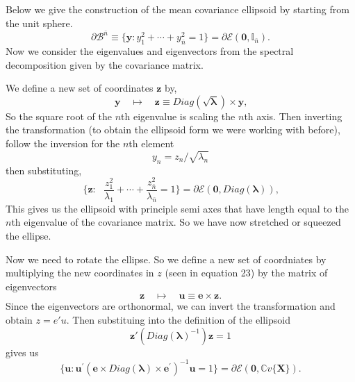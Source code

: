 \documentclass{article}
\theoremstyle{definition}
\theoremstyle{remark}
\begin{document}
\par Below we give the construction of the mean covariance ellipsoid
by starting from the unit sphere. 
\begin{equation}
    \partial\mathcal{B}^{\bar{n}}\equiv\{\boldsymbol{y}:y_{1}^{2}+\cdots +y_{\bar{n}}^{2}=1\}=\partial\mathcal{E}(\boldsymbol{0},\mathbb{I}_{\bar{n}})\text{.}
    \end{equation}
Now we consider the eigenvalues and eigenvectors from the spectral decomposition
given by the covariance matrix. 
\par We define a new set of coordinates $\mathbf{z}$ by,
\begin{equation}
    \boldsymbol{y}\quad\mapsto\quad\boldsymbol{z}\equiv\mathit{Diag}(\sqrt{\boldsymbol{\lambda}})\times\boldsymbol{y}\text{,}
    \end{equation}
So the square root of the $n$th eigenvalue
is scaling the $n$th axis. Then inverting the transformation (to obtain 
the ellipsoid form we were working with before), follow the inversion for the $n$th element 
\[
y_n = z_n / \sqrt{\lambda_n}
\]
then substituting, 
\begin{equation}
    \{\boldsymbol{z}:\text{\ }\frac{z_{1}^{2}}{\lambda_{1}}+\cdots+\frac{z_{\bar{n}}^{2}}{\lambda_{\bar{n}}}=1\}=\partial\mathcal{E}(\boldsymbol{0},\mathit{Diag}(\boldsymbol{\lambda}))\text{,}
    \end{equation}
This gives us the ellipsoid 
with principle semi axes that have length 
equal to the $n$th eigenvalue of the covariance matrix.
So we have now stretched or squeezed the ellipse.
\par Now we need to rotate the ellipse. So we define a new set of
coordniates by multiplying the new coordinates in $z$ (seen in equation 23)
by the matrix of eigenvectors
\begin{equation}
    \boldsymbol{z}\quad\mapsto\quad\boldsymbol{u}\equiv\boldsymbol{e}\times\boldsymbol{z}\text{.}
    \end{equation}
Since the eigenvectors are orthonormal, we can 
invert the transformation and obtain $z = e'u$. 
Then substituing into the definition of the ellipsoid
\[
\mathbf{z'}(Diag(\mathbf{\lambda})^{-1})\mathbf{z} = 1
\]
gives us 
\begin{equation}
    \{\boldsymbol{u}:\boldsymbol{u}^{\prime}\left( \boldsymbol{e}\times \mathit{Diag}(\boldsymbol{\lambda})\times\boldsymbol{e}^{\prime}\right) ^{-1}\boldsymbol{u}=1\}=\partial\mathcal{E}(\boldsymbol{0},\mathbb{C}v\{\boldsymbol{X}\})\text{.}
    \end{equation}
\end{document}
